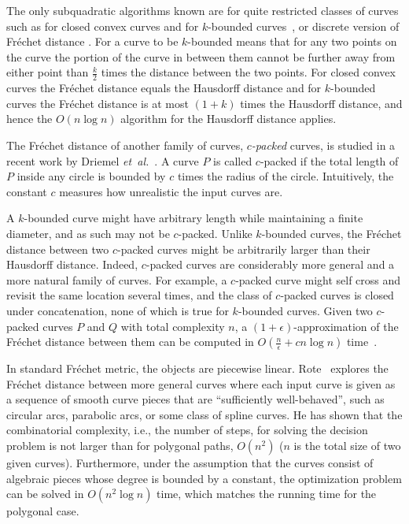 \documentclass[12pt]{dalthesis}
\newcommand{\etal}{{\em et~al.\/}}
\newcommand{\Frechet}{Fr\'echet }
\begin{document}
The only subquadratic algorithms known are for
quite restricted classes of curves such as 
for closed convex curves and for $k$-bounded curves~\cite{Alt2003Comparison}, 
or discrete version of \Frechet distance \cite{DiscreteSUBQuadractic}. 
For a curve to be $k$-bounded means that for any two points on the curve
the portion of the curve in between them cannot be further away from either point than $\frac{k}{2}$
times the distance between the two points.  For closed convex curves the \Frechet distance
equals the Hausdorff distance and for $k$-bounded curves the \Frechet distance is at most
$(1 + k)$ times the Hausdorff distance, and hence the $O(n \log n)$ algorithm for the Hausdorff
distance applies.

The \Frechet distance of another family of curves, {\em $c$-packed} curves, 
is studied in a recent work by Driemel \etal~\cite{c-packedFD}.
A curve $P$ is called $c$-packed if the total length of $P$ inside any 
circle is bounded by $c$ times the radius of the circle. Intuitively, the constant $c$
measures how unrealistic the input curves are.


A $k$-bounded curve might have arbitrary length while maintaining a finite diameter, 
and as such may not be $c$-packed.
Unlike $k$-bounded curves, the \Frechet
distance between two $c$-packed curves might be arbitrarily 
larger than their Hausdorff distance. Indeed, $c$-packed
curves are considerably more general and a more natural
family of curves. For example, a $c$-packed curve might self cross and revisit the same location
several times, and the class of $c$-packed curves is closed under concatenation, 
none of which is true for $k$-bounded curves. Given two $c$-packed curves $P$ and $Q$
with total complexity $n$, a $(1+\epsilon)$-approximation of the \Frechet distance between them 
can be computed in $O(\frac{n}{\epsilon} + c n \log n)$ time~\cite{c-packedFD}.

In standard \Frechet metric, the objects are piecewise linear.
Rote~\cite{smoothFD} explores the \Frechet distance between more general curves where
each input curve is given as a sequence of smooth curve pieces that are “sufficiently well-behaved”, 
such as circular arcs, parabolic arcs, or some class of spline curves. 
He has shown that the combinatorial complexity, i.e., the number of steps, for solving the decision
 problem is not larger than for polygonal paths, $O(n^2)$ ($n$ is the total size of two given curves). 
Furthermore, under the assumption that the curves consist of algebraic pieces whose degree is bounded by a constant, 
the optimization problem can be solved in $O(n^2\log n)$ time, which matches the running time for the polygonal case. 
\end{document}
